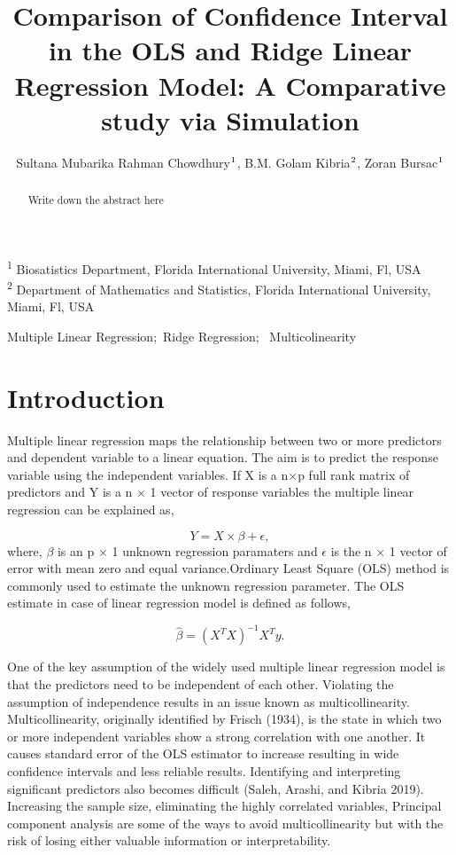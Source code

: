 \documentclass[
]{interact}
\title{Comparison of Confidence Interval in the OLS and Ridge Linear
Regression Model: A Comparative study via Simulation}
\author{Sultana Mubarika Rahman Chowdhury$\textsuperscript{1}$, B.M.
Golam Kibria$\textsuperscript{2}$, Zoran Bursac$\textsuperscript{1}$}
\begin{document}
\captionsetup{labelsep=space}
\maketitle
\textsuperscript{1} Biosatistics Department, Florida International
University, Miami, Fl, USA\\ \textsuperscript{2} Department of
Mathematics and Statistics, Florida International University, Miami,
Fl, USA
\begin{abstract}
Write down the abstract here
\end{abstract}
\begin{keywords}
\def\sep{;\ }
Multiple Linear Regression\sep Ridge Regression\sep 
Multicolinearity
\end{keywords}

\section{Introduction}\label{introduction}

Multiple linear regression maps the relationship between two or more
predictors and dependent variable to a linear equation. The aim is to
predict the response variable using the independent variables. If X is a
n×p full rank matrix of predictors and Y is a n × 1 vector of response
variables the multiple linear regression can be explained as,

\[Y = X \times \beta + \epsilon, \] where, \(\beta\) is an p × 1 unknown
regression paramaters and \(\epsilon\) is the n × 1 vector of error with
mean zero and equal variance.Ordinary Least Square (OLS) method is
commonly used to estimate the unknown regression parameter. The OLS
estimate in case of linear regression model is defined as follows,

\[\hat{\beta} = (X^T X)^{-1} X^T y.\]

One of the key assumption of the widely used multiple linear regression
model is that the predictors need to be independent of each other.
Violating the assumption of independence results in an issue known as
multicollinearity. Multicollinearity, originally identified by Frisch
(1934), is the state in which two or more independent variables show a
strong correlation with one another. It causes standard error of the OLS
estimator to increase resulting in wide confidence intervals and less
reliable results. Identifying and interpreting significant predictors
also becomes difficult (Saleh, Arashi, and Kibria 2019). Increasing the
sample size, eliminating the highly correlated variables, Principal
component analysis are some of the ways to avoid multicollinearity but
with the risk of losing either valuable information or interpretability.
\end{document}
